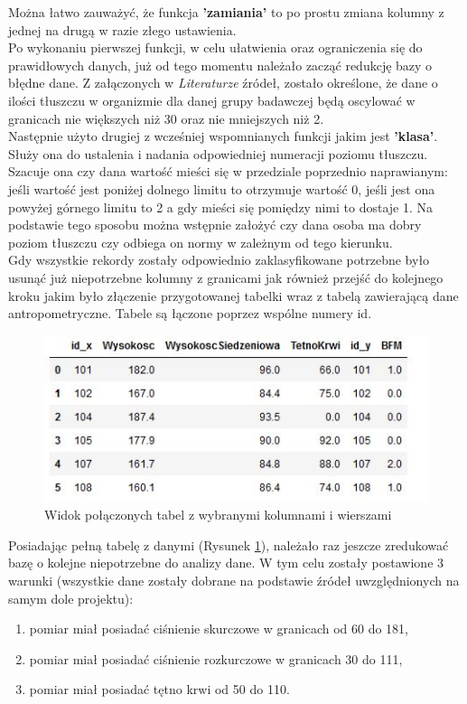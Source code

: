 \documentclass{article}
\begin{document}
	Można łatwo zauważyć, że funkcja \textbf{'zamiania'} to po prostu zmiana kolumny z jednej na drugą w razie złego ustawienia.\\
	Po wykonaniu pierwszej funkcji, w celu ułatwienia oraz ograniczenia się do prawidłowych danych, już od tego momentu należało zacząć redukcję bazy o błędne dane. Z załączonych w \textit{Literaturze} źródeł, zostało określone, że dane o ilości tłuszczu w organizmie dla danej grupy badawczej będą oscylować w granicach nie większych niż 30 oraz nie mniejszych niż 2. \\
	Następnie użyto drugiej z wcześniej wspomnianych funkcji jakim jest \textbf{'klasa'}. Służy ona do ustalenia i nadania odpowiedniej numeracji poziomu tłuszczu. Szacuje ona czy dana wartość mieści się w przedziale poprzednio naprawianym: jeśli wartość jest poniżej dolnego limitu to otrzymuje wartość 0, jeśli jest ona powyżej górnego limitu to 2 a gdy mieści się pomiędzy nimi to dostaje 1. Na podstawie tego sposobu można wstępnie założyć czy dana osoba ma dobry poziom tłuszczu czy odbiega on normy w zależnym od tego kierunku. \\
	Gdy wszystkie rekordy zostały odpowiednio zaklasyfikowane potrzebne było usunąć już niepotrzebne kolumny z granicami jak również przejść do kolejnego kroku jakim było złączenie przygotowanej tabelki wraz z tabelą zawierającą dane antropometryczne. Tabele są łączone poprzez wspólne numery id. \\
	
	\begin{figure}[ht!]
		\centering
		\includegraphics[width=.75\textwidth]{ss/3.JPG}
		\caption{Widok połączonych tabel z wybranymi kolumnami i wierszami}
		\label{tab:baza}
	\end{figure}
	
    Posiadając pełną tabelę z danymi (Rysunek \ref{tab:baza}), należało raz jeszcze zredukować bazę o kolejne niepotrzebne do analizy dane. W tym celu zostały postawione 3 warunki (wszystkie dane zostały dobrane na podstawie źródeł uwzględnionych na samym dole projektu):
    \begin{enumerate}
        \item pomiar miał posiadać ciśnienie skurczowe w granicach od 60 do 181,
        \item pomiar miał posiadać ciśnienie rozkurczowe w granicach 30 do 111,
        \item pomiar miał posiadać tętno krwi od 50 do 110.
    \end{enumerate}
    
\end{document}
